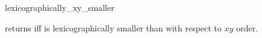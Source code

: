 \begin{ccRefFunction}{lexicographically_xy_smaller}

{returns  iff  is lexicographically smaller
than  with respect to $xy$ order.}

\end{ccRefFunction}

